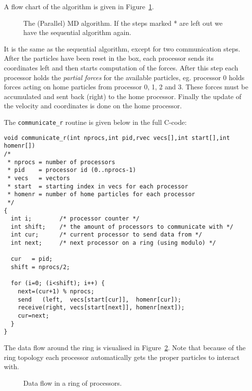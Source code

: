 A flow chart of the algorithm is given in Figure~\ref{Fig:mdpar}.
\begin {figure}
\centerline{}
\caption {The (Parallel) MD algorithm. If the steps marked * are left out we have the sequential algorithm again.}
\label{Fig:mdpar}
\end {figure}
It is the same as the sequential algorithm, except for two communication
steps. After the particles have been reset in the box, each processor
sends its coordinates left and then starts computation of the forces.
After this step each processor holds the {\em partial forces} for the 
available particles, eg. processor 0 holds forces acting on home particles
from processor 0, 1, 2 and 3. These forces must be accumulated and sent back
(right) to the home processor. Finally the update of the velocity and 
coordinates is done on the home processor. 

The {\tt communicate\_r} routine is given below in the full C-code:
\begin{footnotesize}
\begin{verbatim}
void communicate_r(int nprocs,int pid,rvec vecs[],int start[],int homenr[])
/* 
 * nprocs = number of processors
 * pid    = processor id (0..nprocs-1)
 * vecs   = vectors
 * start  = starting index in vecs for each processor
 * homenr = number of home particles for each processor
 */
{
  int i;        /* processor counter */
  int shift;    /* the amount of processors to communicate with */
  int cur;      /* current processor to send data from */
  int next;     /* next processor on a ring (using modulo) */

  cur   = pid;
  shift = nprocs/2;

  for (i=0; (i<shift); i++) {
    next=(cur+1) % nprocs;	
    send   (left,  vecs[start[cur]],  homenr[cur]);
    receive(right, vecs[start[next]], homenr[next]);
    cur=next;
  }
}
\end{verbatim}

\end{footnotesize}

The data flow around the ring is visualised in Figure~\ref{Fig:ring}. 
Note that because of the ring topology each processor automatically 
gets the proper particles to interact with.
\begin {figure}
\centerline{}
\caption {Data flow in a ring of processors.}
\label{Fig:ring}
\end {figure}




